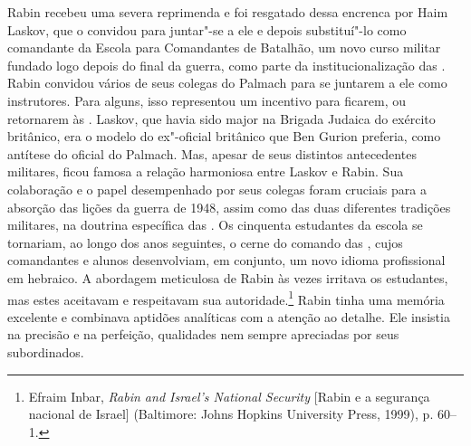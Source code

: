 Rabin recebeu uma severa reprimenda e foi resgatado dessa encrenca por
Haim Laskov, que o convidou para juntar"-se a ele e depois substituí"-lo
como comandante da Escola para Comandantes de Batalhão, um novo curso
militar fundado logo depois do final da guerra, como parte da
institucionalização das . Rabin convidou vários de seus colegas do
Palmach para se juntarem a ele como instrutores. Para alguns, isso representou
um incentivo para ficarem, ou retornarem às . Laskov, que havia sido
major na Brigada Judaica do exército britânico, era o modelo do
ex"-oficial britânico que Ben Gurion preferia, como antítese do oficial
do Palmach. Mas, apesar de seus distintos antecedentes militares, ficou
famosa a relação harmoniosa entre Laskov e Rabin. Sua colaboração e o
papel desempenhado por seus colegas foram cruciais para a absorção das
lições da guerra de 1948, assim como das duas diferentes tradições
militares, na doutrina específica das . Os cinquenta estudantes da
escola se tornariam, ao longo dos anos seguintes, o cerne do comando das
, cujos comandantes e alunos desenvolviam, em conjunto, um novo idioma
profissional em hebraico. A abordagem meticulosa de Rabin às vezes
irritava os estudantes, mas estes aceitavam e respeitavam sua
autoridade.\footnote{Efraim Inbar, \emph{Rabin and Israel's National Security} {[Rabin e a segurança nacional de Israel]} (Baltimore: Johns
Hopkins University Press, 1999), p. 60--1.} Rabin tinha uma memória excelente e combinava
aptidões analíticas com a atenção ao detalhe. Ele insistia na precisão e
na perfeição, qualidades nem sempre apreciadas por seus subordinados.

